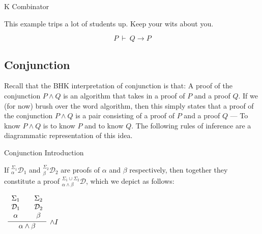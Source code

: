 \documentclass{book}
\begin{document}
    \begin{eg}{K Combinator}
        
        This example trips a lot of students up. Keep your wits about you.

        $$P \ \vdash \ Q \to P$$

    \end{eg}

    \newpage
    \subsection*{Conjunction}

    Recall that the BHK interpretation of conjunction is that: A proof of the conjunction $P \land Q$ is an algorithm that takes in a proof of $P$ and a proof $Q$. If we (for now) brush over the word algorithm, then this simply states that a proof of the conjunction $P \land Q$ is a pair consisting of a proof of $P$ and a proof $Q$ --- To know $P \land Q$ is to know $P$ and to know $Q$. The following rules of inference are a diagrammatic representation of this idea. 

    \vspace{0.1cm}

    \begin{definition}{Conjunction Introduction}

        If $^{\Sigma_{1}}_{\alpha}\mathcal{D}_{1}$ and $^{\Sigma_{2}}_{\beta}\mathcal{D}_{2}$ are proofs of $\alpha$ and $\beta$ respectively, then together they constitute a proof $^{\Sigma_{1} \cup \Sigma_{2}}_{\alpha \land \beta}\mathcal{D}$, which we depict as follows: 

        \begin{center}
            $\begin{array}{c}
                \infer[\land I]{\alpha \land \beta}
                    {\begin{array}{c}
                        \Sigma_{1} \\
                        \mathcal{D}_{1} \\
                        \alpha
                    \end{array}
                    &
                    \begin{array}{c}
                        \Sigma_{2} \\
                        \mathcal{D}_{2} \\
                        \beta
                    \end{array}}
            \end{array}$
        \end{center}
    \end{definition}
\end{document}
